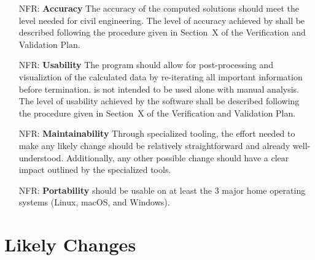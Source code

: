 \documentclass[12pt]{article}
\newcounter{nfrnum} %
\begin{document}
\noindent\begin{itemize}

    \item[NFR\refstepcounter{nfrnum}\thenfrnum \label{NFR_Accuracy}:]
        \textbf{Accuracy} The accuracy of the computed solutions should meet the
        level needed for civil engineering.  The level of accuracy achieved by
        \progname{} shall be described following the procedure given in
        Section~X of the Verification and Validation
        Plan.

    \item[NFR\refstepcounter{nfrnum}\thenfrnum \label{NFR_Usability}:]
        \textbf{Usability} The program should allow for post-processing and
        visualiztion of the calculated data by re-iterating all important
        information before termination. \progname{} is not intended to be used
        alone with manual analysis. The level of usability achieved by the
        software shall be described following the procedure given in
        Section~X of the Verification and Validation
        Plan.

    \item[NFR\refstepcounter{nfrnum}\thenfrnum \label{NFR_Maintainability}:]
        \textbf{Maintainability} Through specialized tooling, the effort needed
        to make any likely change should be relatively straightforward and
        already well-understood. Additionally, any other possible change should
        have a clear impact outlined by the specialized tools.

    \item[NFR\refstepcounter{nfrnum}\thenfrnum \label{NFR_Portability}:]
        \textbf{Portability} \progname{} should be usable on at least the 3
        major home operating systems (Linux, macOS, and Windows).

\end{itemize}



\section{Likely Changes}
\end{document}
